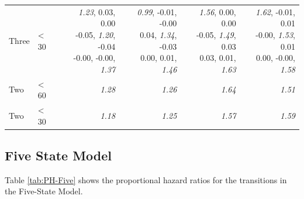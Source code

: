 \documentclass[12pt,PhD,twoside,openright]{muthesis}
\begin{document}
\begin{table}[!h]
\begin{tabular}[t]{>{}l>{}l>{\ttfamily}r>{\ttfamily}r>{\ttfamily}r>{\ttfamily}r}
\hspace{1em}Three & < 30 & \makecell[r]{\emph{1.23},  0.03,  0.00\\ -0.05,  \emph{1.20}, -0.04\\ -0.00, -0.00,  \emph{1.37}} & \makecell[r]{\emph{0.99}, -0.01, -0.00\\  0.04,  \emph{1.34}, -0.03\\  0.00,  0.01,  \emph{1.46}} & \makecell[r]{\emph{1.56},  0.00,  0.00\\ -0.05,  \emph{1.49},  0.03\\  0.03,  0.01,  \emph{1.63}} & \makecell[r]{\emph{1.62}, -0.01,  0.01\\ -0.00,  \emph{1.53},  0.01\\  0.00, -0.00,  \emph{1.58}}\\
\rowcolor{gray!6}  \hspace{1em}Two & < 60 & \emph{1.28} & \emph{1.26} & \emph{1.64} & \emph{1.51}\\
\hspace{1em}Two & < 30 & \emph{1.18} & \emph{1.25} & \emph{1.57} & \emph{1.59}\\
\bottomrule
\end{tabular}
\end{table}
\hypertarget{five-state-model}{%
\subsection{Five State Model}\label{five-state-model}}

Table \ref{tab:PH-Five} shows the proportional hazard ratios for the transitions in the Five-State Model.
\end{document}
